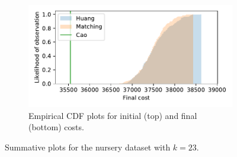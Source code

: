 \documentclass[11pt]{article}
\begin{document}
\begin{figure}
\begin{subfigure}{.5\textwidth}
        \includegraphics[width=\linewidth]{Fig3b2.pdf}
        \caption{Empirical CDF plots for initial (top) and final (bottom)
                 costs.}
    \end{subfigure}
    \caption{Summative plots for the nursery dataset with \(k=23\).}%
    \label{fig:nursery_knee}
\end{figure}
\end{document}
